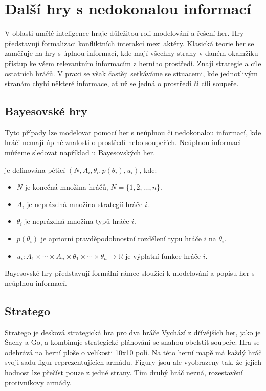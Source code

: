 \section{Další hry s nedokonalou informací}\label{sec:dalsi-hry-s-nedokonalou-informaci}
V oblasti umělé inteligence hraje důležitou roli modelování a řešení her.
Hry představují formalizaci konfliktních interakcí mezi aktéry.
Klasická teorie her se zaměřuje na hry s úplnou informací, kde mají všechny strany v daném okamžiku přístup ke všem relevantním informacím z herního prostředí.
Znají strategie a cíle ostatních hráčů.
V praxi se však častěji setkáváme se situacemi, kde jednotlivým stranám chybí některé informace, ať už se jedná o prostředí či cíli soupeře.

\subsection{Bayesovské hry}
Tyto případy lze modelovat pomocí her s neúplnou či nedokonalou informací, kde hráči nemají úplné znalosti o prostředí nebo soupeřích.
Neúplnou informaci můžeme sledovat například u Bayesovských her.

\begin{definition}
\cite{Y_Narahari} je definována pěticí $(N, A_i, \theta_i, p(\theta_i), u_i)$, kde:

\begin{itemize}
\item $N$ je konečná množina hráčů, $N = \{1, 2, \ldots, n\}$.
\item $A_i$ je neprázdná množina strategií hráče $i$.
\item $\theta_i$ je neprázdná množina typů hráče $i$.
\item $p(\theta_i)$ je apriorní pravděpodobnostní rozdělení typu hráče $i$ na $\theta_i$.
\item $u_i: A_1 \times \cdots \times A_n \times \theta_1 \times \cdots \times \theta_n \rightarrow \mathbb{R}$ je výplatní funkce hráče $i$.
\end{itemize}
\end{definition}

Bayesovské hry představují formální rámec sloužící k modelování a popisu her s neúplnou informací.

\subsection{Stratego}\label{subsec:stratego}
Stratego je desková strategická hra pro dva hráče
Vychází z dřívějších her, jako je Šachy a Go, a kombinuje strategické plánování se snahou obelstít soupeře.
Hra se odehrává na herní ploše o velikosti 10x10 polí.
Na této herní mapě má každý hráč svoji sadu figur reprezentujících armádu.
Figury jsou ale vyobrazeny tak, že jejich hodnost lze přečíst pouze z jedné strany.
Tím druhý hráč nezná, rozestavění protivníkovy armády.

